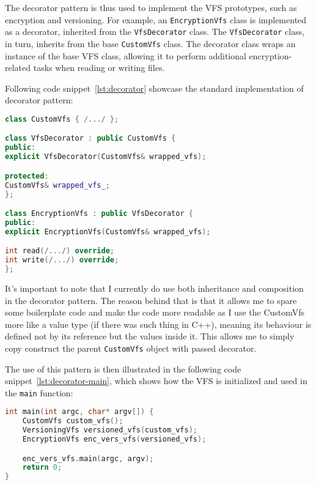 The decorator pattern is thus used to implement the VFS prototypes, such as encryption and versioning.
For example, an \texttt{EncryptionVfs} class is implemented as a decorator, inherited from the \texttt{VfsDecorator} class.
The \texttt{VfsDecorator} class, in turn, inherits from the base \texttt{CustomVfs} class.
The decorator class wraps an instance of the base VFS class, allowing it to perform additional encryption-related tasks when reading or writing files.

Following code snippet~\ref{lst:decorator} showcase the standard implementation of decorator pattern:

\begin{lstlisting}[language=c++, caption={Decorator pattern implementation},label={lst:decorator},basicstyle=\ttfamily\small]
class CustomVfs { /.../ };

class VfsDecorator : public CustomVfs {
public:
explicit VfsDecorator(CustomVfs& wrapped_vfs);

protected:
CustomVfs& wrapped_vfs_;
};

class EncryptionVfs : public VfsDecorator {
public:
explicit EncryptionVfs(CustomVfs& wrapped_vfs);

int read(/.../) override;
int write(/.../) override;
};
\end{lstlisting}

It's important to note that I currently do use both inheritance and composition in the decorator pattern.
The reason behind that is that it allows me to spare some boilerplate code and make the code more readable as I use the CustomVfs more like a value type (if there was such thing in C++), meaning its behaviour is defined not by its reference but the values inside it.
This allows me to simply copy construct the parent \texttt{CustomVfs} object with passed decorator.

The use of this pattern is then illustrated in the following code snippet~\ref{lst:decorator-main}, which shows how the VFS is initialized and used in the \texttt{main} function:

\begin{lstlisting}[language=c++, caption={VFS initialization and usage},label={lst:decorator-main}, basicstyle=\ttfamily\small]
int main(int argc, char* argv[]) {
    CustomVfs custom_vfs();
    VersioningVfs versioned_vfs(custom_vfs);
    EncryptionVfs enc_vers_vfs(versioned_vfs);

    enc_vers_vfs.main(argc, argv);
    return 0;
}
\end{lstlisting}

